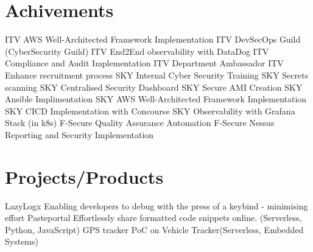 \documentclass[]{twentysecondcv}
\begin{document}
\section{Achivements}
\begin{twentyshort}
  \twentyitemshort
  {ITV}
  {AWS Well-Architected Framework Implementation}
  \twentyitemshort
  {ITV}
  {DevSecOps Guild (CyberSecurity Guild)}
  \twentyitemshort
  {ITV}
  {End2End observability with DataDog}
  \twentyitemshort
  {ITV}
  {Compliance and Audit Implementation}
  \twentyitemshort
  {ITV}
  {Department Ambassador}
  \twentyitemshort
  {ITV}
  {Enhance recruitment process}
  \twentyitemshort
  {SKY}
  {Internal Cyber Security Training}
  \twentyitemshort
  {SKY}
  {Secrets scanning }
  \twentyitemshort
  {SKY}
  {Centralised Security Dashboard}
  \twentyitemshort
  {SKY}
  {Secure AMI Creation}
  \twentyitemshort
  {SKY}
  {Ansible Implimentation}
  \twentyitemshort
  {SKY}
  {AWS Well-Architected Framework Implementation}
  \twentyitemshort
  {SKY}
  {CICD Implementation with Concourse}
  \twentyitemshort
  {SKY}
  {Observability with Grafana Stack (in k8s)}
  \twentyitemshort
  {F-Secure}
  {Quality Assurance Automation}
  \twentyitemshort
  {F-Secure}
  {Nessus Reporting and Security Implementation}
\end{twentyshort}



\section{Projects/Products}
\begin{twentyshort}
  \twentyitemshort
  {LazyLogx}
  {Enabling developers to debug with the press of a keybind - minimising effort}
  \twentyitemshort
  {Pasteportal}
  {Effortlessly share formatted code snippets online. (Serverless, Python, JavaScript)}
  \twentyitemshort
  {GPS tracker}
  {PoC on Vehicle Tracker(Serverless, Embedded Systems) }
\end{twentyshort}
\end{document}
